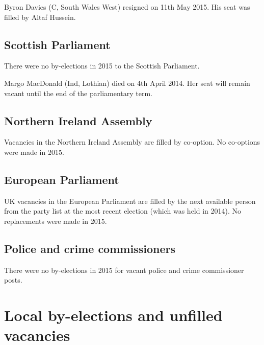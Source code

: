 \documentclass[a4paper,openany]{book}
\begin{document}
Byron Davies (C, South Wales West) resigned on 11th May 2015.  His seat was filled by Altaf Hussein.

\section{Scottish Parliament}

There were no by-elections in 2015 to the Scottish Parliament.

Margo MacDonald (Ind, Lothian) died on 4th April 2014.  Her seat will remain vacant until the end of the parliamentary term.

\section{Northern Ireland Assembly}

Vacancies in the Northern Ireland Assembly are filled by co-option.  No co-options were made in 2015.


\section{European Parliament}

UK vacancies in the European Parliament are filled by the next available person from the party list at the most recent election (which was held in 2014). 
No replacements were made in 2015.

\section{Police and crime commissioners}

There were no by-elections in 2015 for vacant police and crime commissioner posts.

\chapter{Local by-elections and unfilled vacancies}
\end{document}
